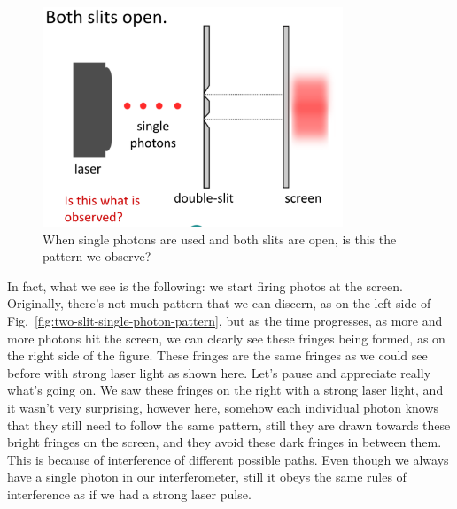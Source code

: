 \begin{figure}[H]
   \centering
    \includegraphics[width=0.8\textwidth]{lesson6/block_neither.pdf}
    
        \caption{When single photons are used and both slits are open, is this the pattern we observe?}
    \label{fig:two-slit-single-photon-wrong}
    
\end{figure}

In fact, what we see is the following: we start firing photos at the screen. Originally, there's not much pattern that we can discern, as on the left side of Fig.~\ref{fig:two-slit-single-photon-pattern}, but as the time progresses, as more and more photons hit the screen, we can clearly see these fringes being formed, as on the right side of the figure. These fringes are the same fringes as we could see before with strong laser light as shown here. Let's pause and appreciate really what's going on. We saw these fringes on the right with a strong laser light, and it wasn't very surprising, however here, somehow each individual photon knows that they still need to follow the same pattern, still they are drawn towards these bright fringes on the screen, and they avoid these dark fringes in between them. This is because of interference of different possible paths. Even though we always have a single photon in our interferometer, still it obeys the same rules of interference as if we had a strong laser pulse.


